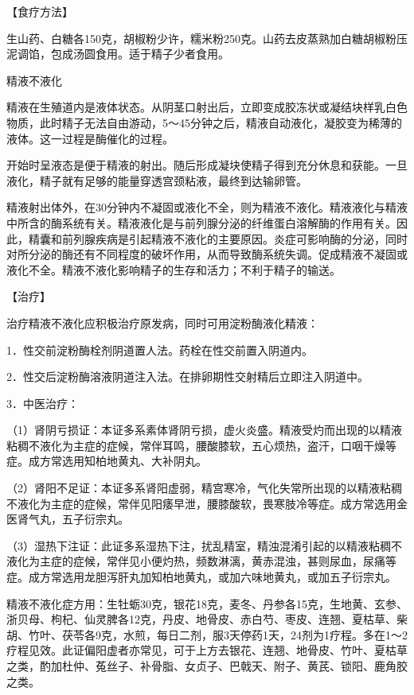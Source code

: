 \documentclass[12pt,UTF8]{ctexbook}
\begin{document}
【食疗方法】

生山药、白糖各150克，胡椒粉少许，糯米粉250克。山药去皮蒸熟加白糖胡椒粉压泥调馅，包成汤圆食用。适于精子少者食用。





精液不液化


精液在生殖道内是液体状态。从阴茎口射出后，立即变成胶冻状或凝结块样乳白色物质，此时精子无法自由游动，5～45分钟之后，精液自动液化，凝胶变为稀薄的液体。这一过程是酶催化的过程。

开始时呈液态是便于精液的射出。随后形成凝块使精子得到充分休息和获能。一旦液化，精子就有足够的能量穿透宫颈粘液，最终到达输卵管。

精液射出体外，在30分钟内不凝固或液化不全，则为精液不液化。精液液化与精液中所含的酶系统有关。精液液化是与前列腺分泌的纤维蛋白溶解酶的作用有关。因此，精囊和前列腺疾病是引起精液不液化的主要原因。炎症可影响酶的分泌，同时对所分泌的酶还有不同程度的破坏作用，从而导致酶系统失调。促成精液不凝固或液化不全。精液不液化影响精子的生存和活力；不利于精子的输送。

【治疗】

治疗精液不液化应积极治疗原发病，同时可用淀粉酶液化精液：

1．性交前淀粉酶栓剂阴道置人法。药栓在性交前置入阴道内。

2．性交后淀粉酶溶液阴道注入法。在排卵期性交射精后立即注入阴道中。

3．中医治疗：

（1）肾阴亏损证：本证多系素体肾阴亏损，虚火炎盛。精液受灼而出现的以精液粘稠不液化为主症的症候，常伴耳鸣，腰酸膝软，五心烦热，盗汗，口咽干燥等症。成方常选用知柏地黄丸、大补阴丸。

（2）肾阳不足证：本证多系肾阳虚弱，精宫寒冷，气化失常所出现的以精液粘稠不液化为主症的症候，常伴见阳痿早泄，腰膝酸软，畏寒肢冷等症。成方常选用金医肾气丸，五子衍宗丸。

（3）湿热下注证：此证多系湿热下注，扰乱精室，精浊混淆引起的以精液粘稠不液化为主症的症候，常伴见小便灼热，频数淋漓，黄赤混浊，甚则尿血，尿痛等症。成方常选用龙胆泻肝丸加知柏地黄丸，或加六味地黄丸，或加五子衍宗丸。

精液不液化症方用：生牡蛎30克，银花18克，麦冬、丹参各15克，生地黄、玄参、浙贝母、枸杞、仙灵脾各12克，丹皮、地骨皮、赤白芍、枣皮、连翘、夏枯草、柴胡、竹叶、茯苓各9克，水煎，每日二剂，服3天停药1天，24剂为1疗程。多在1～2疗程见效。此证偏阳虚者亦常见，可于上方去银花、连翘、地骨皮、竹叶、夏枯草之类，酌加杜仲、菟丝子、补骨脂、女贞子、巴戟天、附子、黄芪、锁阳、鹿角胶之类。
\end{document}
